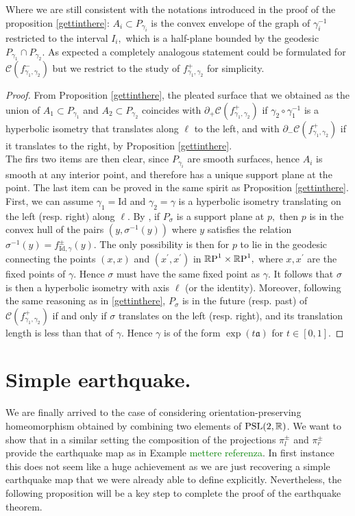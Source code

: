 Where we are still consistent with the notations introduced in the proof of the proposition \ref{gettinthere}: $A_i\subset P_{\gamma_i}$ is the convex envelope of the graph of $\gamma_i^{-1}$ restricted to the interval $I_i,$ which is a half-plane bounded by the geodesic $P_{\gamma_1}\cap P_{\gamma_2}.$ As expected a completely analogous statement could be formulated for $\mathcal{C}(f_{\gamma_1,\gamma_2}^{-})$ but we restrict to the study of $f_{\gamma_1,\gamma_2}^{+}$ for simplicity. 

\begin{proof}
    From Proposition \ref{gettinthere}, the pleated surface that we obtained as the union of $A_1\subset P_{\gamma_1}$ and $A_2\subset P_{\gamma_2}$ coincides with $\partial_+\mathcal{C}(f_{\gamma_1,\gamma_2}^+)$ if $\gamma_2\circ\gamma_1^{-1}$ is a hyperbolic isometry that translates along $\ell$ to the left, and with $\partial_-\mathcal{C}(f_{\gamma_1,\gamma_2}^+)$ if it translates to the right, by Proposition \ref{gettinthere}. \\
    The firs two items are then clear, since $P_{\gamma_i}$ are smooth surfaces, hence $A_i$ is smooth at any interior point, and therefore has a unique support plane at the point. The last item can be proved in the same spirit as Proposition \ref{gettinthere}. First, we can assume $\gamma_1=\text{Id}$ and $\gamma_2=\gamma$ is a hyperbolic isometry translating on the left (resp. right) along $\ell.$ By , if $P_\sigma$ is a support plane at $p,$ then $p$ is in the convex hull of the pairs $(y,\sigma^{-1}(y))$ where $y$ satisfies the relation $\sigma^{-1}(y)=f_{\text{Id},\gamma}^{\pm}(y).$ The only possibility is then for $p$ to lie in the geodesic connecting the points $(x,x)$ and $(x^{\prime},x^{\prime})$ in $\mathbb{R}\text{P}^1\times\mathbb{R}\text{P}^1,$ where $x,x^{\prime}$ are the fixed points of $\gamma$. Hence $\sigma$ must have the same fixed point as $\gamma$. It follows that $\sigma$ is then a hyperbolic isometry with axis $\ell$ (or the identity). Moreover, following the same reasoning as in \ref{gettinthere}, $P_\sigma$ is in the future (resp. past) of $\mathcal{C}(f_{\gamma_1,\gamma_2}^+)$ if and only if $\sigma$ translates on the left (resp. right), and its translation length is less than that of $\gamma.$ Hence $\gamma$ is of the form $\exp(t\mathfrak{a})$ for $t\in [0,1].$
\end{proof}

\section{Simple earthquake.}
We are finally arrived to the case of considering orientation-preserving homeomorphism obtained by combining two elements of $\text{PSL}(2,\mathbb{R})$. We want to show that in a similar setting the composition of the projections $\pi_l^{\pm}$ and $\pi_r^\pm$ provide the earthquake map as in Example \textcolor{green}{mettere referenza}. In first instance this does not seem like a huge achievement as we are just recovering a simple earthquake map that we were already able to define explicitly. Nevertheless, the following proposition will be a key step to complete the proof of the earthquake theorem. 

